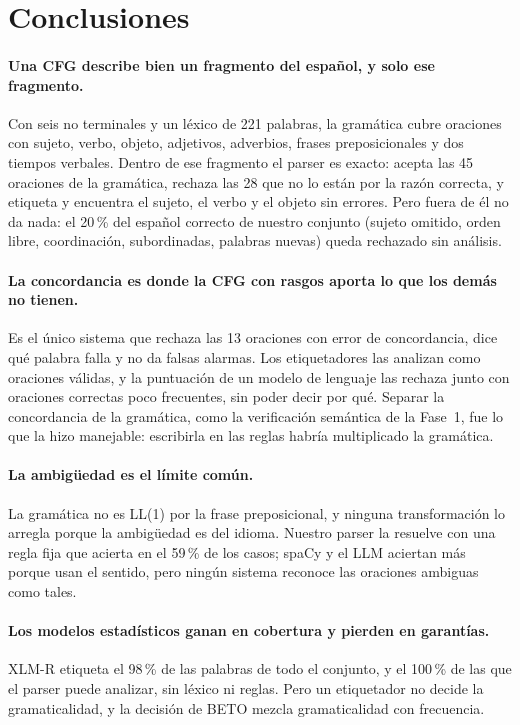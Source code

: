 \section{Conclusiones}
\label{sec:conclusiones}

\paragraph{Una CFG describe bien un fragmento del español, y solo ese fragmento.} Con seis no
terminales y un léxico de 221 palabras, la gramática cubre oraciones con sujeto, verbo, objeto,
adjetivos, adverbios, frases preposicionales y dos tiempos verbales. Dentro de ese fragmento el
parser es exacto: acepta las 45 oraciones de la gramática, rechaza las 28 que no lo están por la
razón correcta, y etiqueta y encuentra el sujeto, el verbo y el objeto sin errores. Pero fuera de
él no da nada: el 20\,\% del español correcto de nuestro conjunto (sujeto omitido, orden libre,
coordinación, subordinadas, palabras nuevas) queda rechazado sin análisis.

\paragraph{La concordancia es donde la CFG con rasgos aporta lo que los demás no tienen.} Es el
único sistema que rechaza las 13 oraciones con error de concordancia, dice qué palabra falla y no
da falsas alarmas. Los etiquetadores las analizan como oraciones válidas, y la puntuación de un
modelo de lenguaje las rechaza junto con oraciones correctas poco frecuentes, sin poder decir
por qué. Separar la concordancia de la gramática, como la verificación semántica de la Fase~1, fue
lo que la hizo manejable: escribirla en las reglas habría multiplicado la gramática.

\paragraph{La ambigüedad es el límite común.} La gramática no es LL(1) por la frase
preposicional, y ninguna transformación lo arregla porque la ambigüedad es del idioma. Nuestro
parser la resuelve con una regla fija que acierta en el 59\,\% de los casos; spaCy y el LLM
aciertan más porque usan el sentido, pero ningún sistema reconoce las oraciones ambiguas como
tales.

\paragraph{Los modelos estadísticos ganan en cobertura y pierden en garantías.} XLM-R etiqueta
el 98\,\% de las palabras de todo el conjunto, y el 100\,\% de las que el parser puede analizar,
sin léxico ni reglas. Pero un etiquetador no decide la gramaticalidad, y la decisión de BETO
mezcla gramaticalidad con frecuencia.

